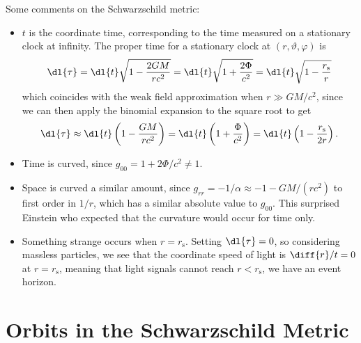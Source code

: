 \documentclass[fleqn]{NotesClass}
\begin{document}
    Some comments on the Schwarzschild metric:
    \begin{itemize}
        \item \(t\) is the coordinate time, corresponding to the time measured on a stationary clock at infinity.
        The proper time for a stationary clock at \((r, \vartheta, \varphi)\) is
        \begin{equation}
            \dl{\tau} = \dl{t}\sqrt{1 - \frac{2GM}{rc^2}} = \dl{t}\sqrt{1 + \frac{2\Phi}{c^2}} = \dl{t}\sqrt{1 - \frac{r_{\mathrm{s}}}{r}}
        \end{equation}
        which coincides with the weak field approximation when \(r \gg GM/c^2\), since we can then apply the binomial expansion to the square root to get
        \begin{equation}
            \dl{\tau} \approx \dl{t}\left( 1 - \frac{GM}{rc^2} \right) = \dl{t}\left( 1 + \frac{\Phi}{c^2} \right) = \dl{t}\left( 1 - \frac{r_{\mathrm{s}}}{2r} \right).
        \end{equation}
        \item Time is curved, since \(g_{00} = 1 + 2\Phi/c^2 \ne 1\).
        \item Space is curved a similar amount, since \(g_{rr} = -1/\alpha \approx -1 - GM/(rc^2)\) to first order in \(1/r\), which has a similar absolute value to \(g_{00}\).
        This surprised Einstein who expected that the curvature would occur for time only.
        \item Something strange occurs when \(r = r_{\mathrm{s}}\).
        Setting \(\dl{\tau} = 0\), so considering massless particles, we see that the coordinate speed of light is \(\diff{r}/{t} = 0\) at \(r = r_{\mathrm{s}}\), meaning that light signals cannot reach \(r < r_{\mathrm{s}}\), we have an event horizon.
    \end{itemize}

    \chapter{Orbits in the Schwarzschild Metric}
\end{document}
